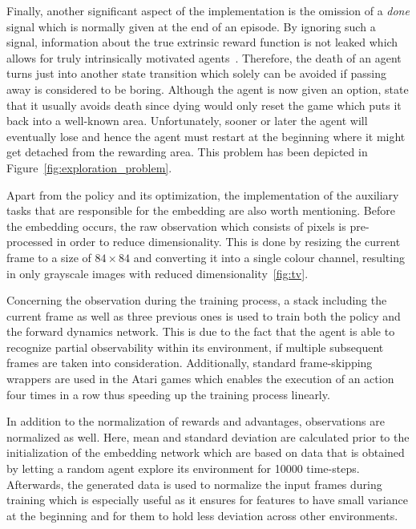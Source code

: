 \documentclass[draft,final]{vutinfth} %
\begin{document}
    Finally, another significant aspect of the implementation is the omission of a \textit{done} signal which is normally given at the end of an episode.
    By ignoring such a signal, information about the true extrinsic reward function is not leaked which allows for truly intrinsically motivated agents~\citep{burda_large-scale_2018-1}.
    Therefore, the death of an agent turns just into another state transition which solely can be avoided if passing away is considered to be boring.
    Although the agent is now given an option, \citet{burda_large-scale_2018-1} state that it usually avoids death since dying would only reset the game which puts it back into a well-known area.
    Unfortunately, sooner or later the agent will eventually lose and hence the agent must restart at the beginning where it might get detached from the rewarding area.
    This problem has been depicted in Figure~\ref{fig:exploration_problem}.

    Apart from the policy and its optimization, the implementation of the auxiliary tasks that are responsible for the embedding are also worth mentioning.
    Before the embedding occurs, the raw observation which consists of pixels is pre-processed in order to reduce dimensionality.
    This is done by resizing the current frame to a size of $84 \times 84$ and converting it into a single colour channel, resulting in only grayscale images with reduced dimensionality~\eqref{fig:tv}.

    Concerning the observation during the training process, a stack including the current frame as well as three previous ones is used to train both the policy and the forward dynamics network.
    This is due to the fact that the agent is able to recognize partial observability within its environment, if multiple subsequent frames are taken into consideration.
    Additionally, standard frame-skipping wrappers are used in the Atari games which enables the execution of an action four times in a row thus speeding up the training process linearly.

    In addition to the normalization of rewards and advantages, observations are normalized as well.
    Here, mean and standard deviation are calculated prior to the initialization of the embedding network which are based on data that is obtained by letting a random agent explore its environment for 10000 time-steps.
    Afterwards, the generated data is used to normalize the input frames during training which is especially useful as it ensures for features to have small variance at the beginning and for them to hold less deviation across other environments.
\end{document}
